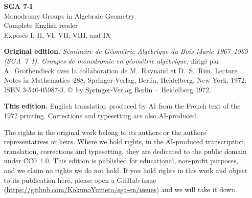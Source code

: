 \documentclass[11pt,a4paper,leqno]{article}
\begin{document}
\begin{titlepage}
\centering
\vspace*{2.2in}
{\LARGE\textbf{SGA 7-I}}\\[0.6em]
{\Large Monodromy Groups in Algebraic Geometry}\\[1.5em]
{\large Complete English reader}\\[1.2em]
{\normalsize Exposés I, II, VI, VII, VIII, and IX}
\vfill
\end{titlepage}
\clearpage
\thispagestyle{empty}
\null\vfill
\begingroup\small
\noindent\textbf{Original edition.} \textit{S\'eminaire de G\'eom\'etrie Alg\'ebrique du Bois-Marie 1967--1969 (SGA~7~I). Groupes de monodromie en g\'eom\'etrie alg\'ebrique}, dirig\'e par A.~Grothendieck avec la collaboration de M.~Raynaud et D.~S.~Rim. Lecture Notes in Mathematics~288, Springer-Verlag, Berlin, Heidelberg, New York, 1972. ISBN 3-540-05987-3. \copyright{}~by Springer-Verlag Berlin~$\cdot$~Heidelberg 1972.\par
\medskip
\noindent\textbf{This edition.} English translation produced by AI from the French text of the 1972 printing. Corrections and typesetting are also AI-produced.\par
\medskip
\noindent The rights in the original work belong to its authors or the authors' representatives or heirs. Where we hold rights, in the AI-produced transcription, translation, corrections and typesetting, they are dedicated to the public domain under CC0~1.0. This edition is published for educational, non-profit purposes, and we claim no rights we do not hold. If you hold rights in this work and object to its publication here, please open a GitHub issue (\url{https://github.com/KokunoYumeto/sga-en/issues}) and we will take it down.\par
\endgroup
\clearpage
\tableofcontents
\clearpage
{}

\clearpage
{}







\clearpage
{}

\clearpage
{}

\end{document}
